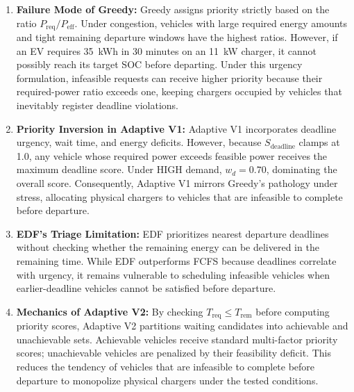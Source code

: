 \documentclass[conference]{IEEEtran}
\begin{document}
\begin{enumerate}
    \item \textbf{Failure Mode of Greedy:} Greedy assigns priority strictly based on the ratio $P_{\mathrm{req}} / P_{\mathrm{eff}}$. Under congestion, vehicles with large required energy amounts and tight remaining departure windows have the highest ratios. However, if an EV requires 35~kWh in 30 minutes on an 11~kW charger, it cannot possibly reach its target SOC before departing. Under this urgency formulation, infeasible requests can receive higher priority because their required-power ratio exceeds one, keeping chargers occupied by vehicles that inevitably register deadline violations.
    \item \textbf{Priority Inversion in Adaptive V1:} Adaptive V1 incorporates deadline urgency, wait time, and energy deficits. However, because $S_{\mathrm{deadline}}$ clamps at 1.0, any vehicle whose required power exceeds feasible power receives the maximum deadline score. Under HIGH demand, $w_d = 0.70$, dominating the overall score. Consequently, Adaptive V1 mirrors Greedy's pathology under stress, allocating physical chargers to vehicles that are infeasible to complete before departure.
    \item \textbf{EDF's Triage Limitation:} EDF prioritizes nearest departure deadlines without checking whether the remaining energy can be delivered in the remaining time. While EDF outperforms FCFS because deadlines correlate with urgency, it remains vulnerable to scheduling infeasible vehicles when earlier-deadline vehicles cannot be satisfied before departure.
    \item \textbf{Mechanics of Adaptive V2:} By checking $T_{\mathrm{req}} \le T_{\mathrm{rem}}$ before computing priority scores, Adaptive V2 partitions waiting candidates into achievable and unachievable sets. Achievable vehicles receive standard multi-factor priority scores; unachievable vehicles are penalized by their feasibility deficit. This reduces the tendency of vehicles that are infeasible to complete before departure to monopolize physical chargers under the tested conditions.
\end{enumerate}
\end{document}
